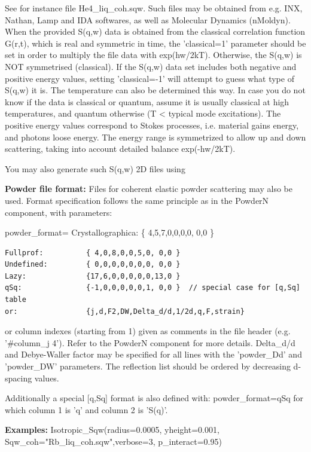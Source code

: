See for instance file He4\_liq\_coh.sqw. Such files may be obtained from e.g. INX, Nathan, Lamp and IDA softwares, as well as Molecular Dynamics (nMoldyn). When the provided S(q,w) data is obtained from the classical correlation function G(r,t), which is real and symmetric in time, the 'classical=1' parameter should be set in order to multiply the file data with exp(hw/2kT). Otherwise, the S(q,w) is NOT symmetrised (classical). If the S(q,w) data set includes both negative and positive energy values, setting 'classical=-1' will attempt to guess what type of S(q,w) it is. The temperature can also be determined this way. In case you do not know if the data is classical or quantum, assume it is usually classical at high temperatures, and quantum otherwise (T \textless{} typical mode excitations). The positive energy values correspond to Stokes processes, i.e. material gains energy, and photons loose energy. The energy range is symmetrized to allow up and down scattering, taking into account detailed balance exp(-hw/2kT).

You may also generate such S(q,w) 2D files using 

\textbf{Powder file format:} Files for coherent elastic powder scattering may also be used. Format specification follows the same principle as in the PowderN component, with parameters:

powder\_format= Crystallographica: \{ 4,5,7,0,0,0,0, 0,0 \}

\begin{verbatim}
Fullprof:          { 4,0,8,0,0,5,0, 0,0 }
Undefined:         { 0,0,0,0,0,0,0, 0,0 }
Lazy:              {17,6,0,0,0,0,0,13,0 }
qSq:               {-1,0,0,0,0,0,1, 0,0 }  // special case for [q,Sq] table
or:                {j,d,F2,DW,Delta_d/d,1/2d,q,F,strain}
\end{verbatim}

or column indexes (starting from 1) given as comments in the file header (e.g. '\#column\_j 4'). Refer to the PowderN component for more details. Delta\_d/d and Debye-Waller factor may be specified for all lines with the 'powder\_Dd' and 'powder\_DW' parameters. The reflection list should be ordered by decreasing d-spacing values.

Additionally a special [q,Sq] format is also defined with: powder\_format=qSq for which column 1 is 'q' and column 2 is 'S(q)'.

\textbf{Examples:} Isotropic\_Sqw(radius=0.0005, yheight=0.001, Sqw\_coh="Rb\_liq\_coh.sqw",verbose=3, p\_interact=0.95)

